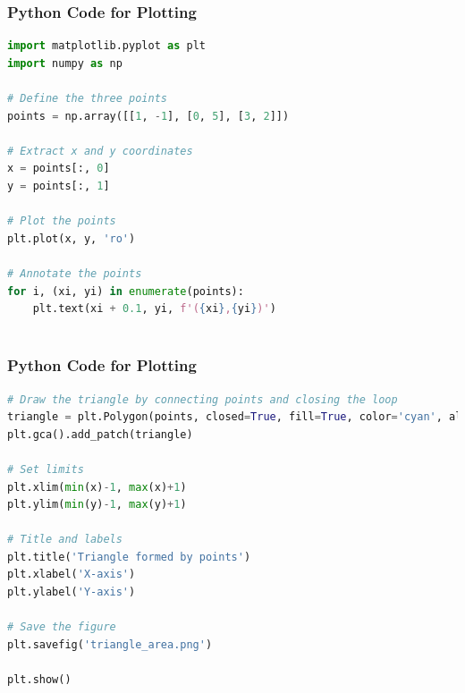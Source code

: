 \documentclass{beamer}
\theoremstyle{remark}
\numberwithin{equation}{section}
\begin{document}
\begin{frame}[fragile]
\frametitle{Python Code for Plotting}
\begin{lstlisting}[language=Python]
import matplotlib.pyplot as plt
import numpy as np

# Define the three points
points = np.array([[1, -1], [0, 5], [3, 2]])

# Extract x and y coordinates
x = points[:, 0]
y = points[:, 1]

# Plot the points
plt.plot(x, y, 'ro')

# Annotate the points
for i, (xi, yi) in enumerate(points):
    plt.text(xi + 0.1, yi, f'({xi},{yi})')



\end{lstlisting}

\end{frame}
\begin{frame}[fragile]
\frametitle{Python Code for Plotting}
\begin{lstlisting}[language=Python]   
# Draw the triangle by connecting points and closing the loop
triangle = plt.Polygon(points, closed=True, fill=True, color='cyan', alpha=0.3)
plt.gca().add_patch(triangle)

# Set limits
plt.xlim(min(x)-1, max(x)+1)
plt.ylim(min(y)-1, max(y)+1)

# Title and labels
plt.title('Triangle formed by points')
plt.xlabel('X-axis')
plt.ylabel('Y-axis')

# Save the figure
plt.savefig('triangle_area.png')

plt.show()
\end{lstlisting}

\end{frame}
\end{document}
